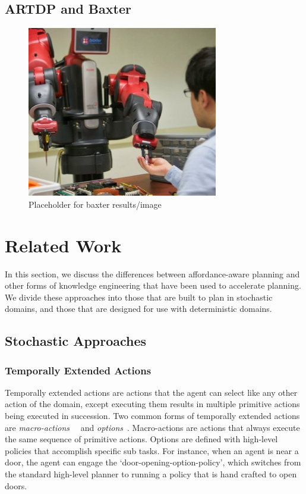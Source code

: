 \documentclass[conference]{IEEEtran}
\newcommand{\dnote}[1]{\textcolor{Green}{\textbf{}}}
\begin{document}
\subsection{ARTDP and Baxter}

\dnote{Insert description of baxter stuff here}

\dnote{Experiments not yet finished}

\begin{figure}[H]
\centering
\includegraphics[scale=0.195]{figures/baxter_temp.jpg}%
  \caption{Placeholder for baxter results/image}
  \label{fig:baxter_results}
\end{figure}

\section{Related Work}
\label{sec:related-work}

In this section, we discuss the differences between
affordance-aware planning and other forms of knowledge engineering that
have been used to accelerate planning. We divide these approaches
into those that are built to plan in stochastic domains, and those that are
designed for use with deterministic domains.

\subsection{Stochastic Approaches}

\subsubsection{Temporally Extended Actions}
Temporally extended actions are actions that the agent can
select like any other action of the domain, except executing them
results in multiple primitive actions being executed in
succession. Two common forms of temporally extended actions are {\em
  macro-actions}~\cite{hauskrecht98} ~and {\em options}~\cite{sutton99}. 
Macro-actions are actions that always
execute the same sequence of primitive actions. Options are defined
with high-level policies that accomplish specific sub tasks. For
instance, when an agent is near a door, the agent can engage the
`door-opening-option-policy', which switches from the standard
high-level planner to running a policy that is hand crafted to open
doors. 
\end{document}

